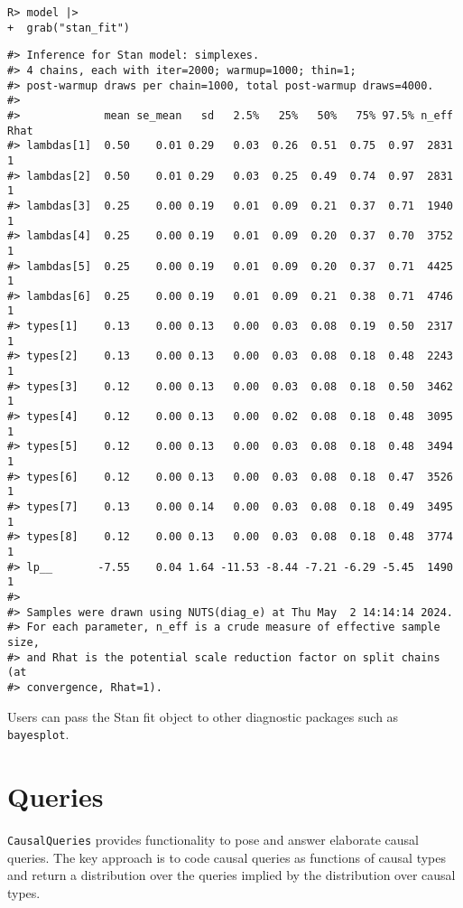 \documentclass[
  11pt,
  article]{jss}
\begin{document}
\begin{verbatim}
R> model |> 
+  grab("stan_fit")
\end{verbatim}

\begin{verbatim}
#> Inference for Stan model: simplexes.
#> 4 chains, each with iter=2000; warmup=1000; thin=1; 
#> post-warmup draws per chain=1000, total post-warmup draws=4000.
#> 
#>             mean se_mean   sd   2.5%   25%   50%   75% 97.5% n_eff Rhat
#> lambdas[1]  0.50    0.01 0.29   0.03  0.26  0.51  0.75  0.97  2831    1
#> lambdas[2]  0.50    0.01 0.29   0.03  0.25  0.49  0.74  0.97  2831    1
#> lambdas[3]  0.25    0.00 0.19   0.01  0.09  0.21  0.37  0.71  1940    1
#> lambdas[4]  0.25    0.00 0.19   0.01  0.09  0.20  0.37  0.70  3752    1
#> lambdas[5]  0.25    0.00 0.19   0.01  0.09  0.20  0.37  0.71  4425    1
#> lambdas[6]  0.25    0.00 0.19   0.01  0.09  0.21  0.38  0.71  4746    1
#> types[1]    0.13    0.00 0.13   0.00  0.03  0.08  0.19  0.50  2317    1
#> types[2]    0.13    0.00 0.13   0.00  0.03  0.08  0.18  0.48  2243    1
#> types[3]    0.12    0.00 0.13   0.00  0.03  0.08  0.18  0.50  3462    1
#> types[4]    0.12    0.00 0.13   0.00  0.02  0.08  0.18  0.48  3095    1
#> types[5]    0.12    0.00 0.13   0.00  0.03  0.08  0.18  0.48  3494    1
#> types[6]    0.12    0.00 0.13   0.00  0.03  0.08  0.18  0.47  3526    1
#> types[7]    0.13    0.00 0.14   0.00  0.03  0.08  0.18  0.49  3495    1
#> types[8]    0.12    0.00 0.13   0.00  0.03  0.08  0.18  0.48  3774    1
#> lp__       -7.55    0.04 1.64 -11.53 -8.44 -7.21 -6.29 -5.45  1490    1
#> 
#> Samples were drawn using NUTS(diag_e) at Thu May  2 14:14:14 2024.
#> For each parameter, n_eff is a crude measure of effective sample size,
#> and Rhat is the potential scale reduction factor on split chains (at 
#> convergence, Rhat=1).
\end{verbatim}

Users can pass the Stan fit object to other diagnostic packages such as
\texttt{bayesplot}.

\hypertarget{sec-query}{%
\section{Queries}\label{sec-query}}

\texttt{CausalQueries} provides functionality to pose and answer
elaborate causal queries. The key approach is to code causal queries as
functions of causal types and return a distribution over the queries
implied by the distribution over causal types.
\end{document}
